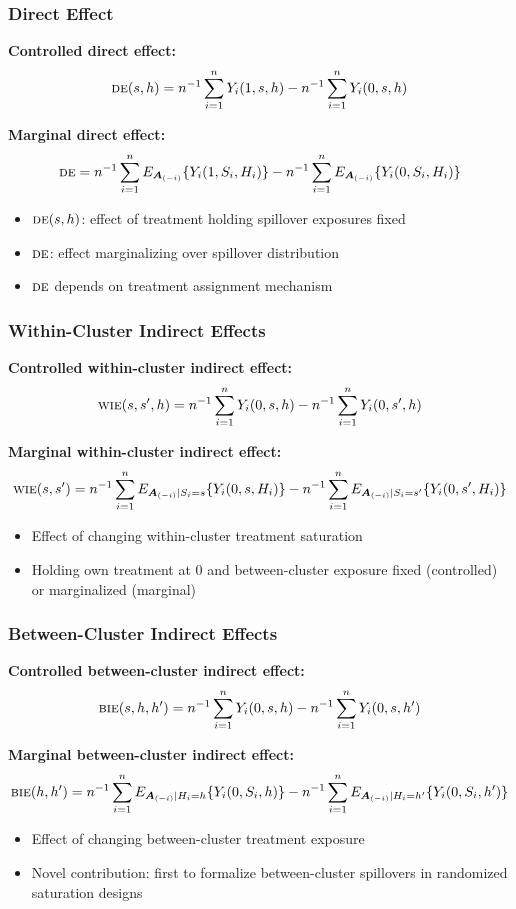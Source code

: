 \documentclass{beamer}
\newcommand{\de}{\textsc{de}}
\newcommand{\bie}{\textsc{bie}}
\newcommand{\wie}{\textsc{wie}}
\newcommand{\sumi}{\sum_{i=1}^n}
\newcommand{\bA}{\boldsymbol{A}}
\begin{document}
\begin{frame}
\frametitle{Direct Effect}
\textbf{Controlled direct effect:}
$$\de(s,h) = n^{-1}\sumi Y_i(1,s,h) - n^{-1}\sumi Y_i(0,s,h)$$

\vspace{0.5cm}
\textbf{Marginal direct effect:}
$$\de = n^{-1}\sumi E_{\bA_{(-i)}}\{Y_i(1,S_i,H_i)\} - n^{-1}\sumi E_{\bA_{(-i)}}\{Y_i(0,S_i,H_i)\}$$

\vspace{0.5cm}
\begin{itemize}
\item $\de(s,h)$: effect of treatment holding spillover exposures fixed
\item $\de$: effect marginalizing over spillover distribution
\item $\de$ depends on treatment assignment mechanism
\end{itemize}
\end{frame}

\begin{frame}
\frametitle{Within-Cluster Indirect Effects}
\textbf{Controlled within-cluster indirect effect:}
$$\wie(s,s',h) = n^{-1}\sumi Y_i(0,s,h) - n^{-1}\sumi Y_i(0,s',h)$$

\vspace{0.5cm}
\textbf{Marginal within-cluster indirect effect:}
$$\wie(s,s') = n^{-1}\sumi E_{\bA_{(-i)}|S_i=s}\{Y_i(0,s,H_i)\} - n^{-1}\sumi E_{\bA_{(-i)}|S_i=s'}\{Y_i(0,s',H_i)\}$$

\vspace{0.5cm}
\begin{itemize}
\item Effect of changing within-cluster treatment saturation
\item Holding own treatment at 0 and between-cluster exposure fixed (controlled) or marginalized (marginal)
\end{itemize}
\end{frame}

\begin{frame}
\frametitle{Between-Cluster Indirect Effects}
\textbf{Controlled between-cluster indirect effect:}
$$\bie(s,h,h') = n^{-1}\sumi Y_i(0,s,h) - n^{-1}\sumi Y_i(0,s,h')$$

\vspace{0.5cm}
\textbf{Marginal between-cluster indirect effect:}
$$\bie(h,h') = n^{-1}\sumi E_{\bA_{(-i)}|H_i=h}\{Y_i(0,S_i,h)\} - n^{-1}\sumi E_{\bA_{(-i)}|H_i=h'}\{Y_i(0,S_i,h')\}$$

\vspace{0.5cm}
\begin{itemize}
\item Effect of changing between-cluster treatment exposure
\item Novel contribution: first to formalize between-cluster spillovers in randomized saturation designs
\end{itemize}
\end{frame}
\end{document}
